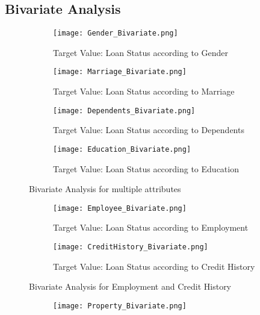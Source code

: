 \documentclass[10pt]{article}
\begin{document}
\begin{enumerate}
\subsection*{Bivariate Analysis}
\begin{figure}[H]
    \centering
    \begin{subfigure}[b]{0.45\linewidth}
        \texttt{[image: Gender\_Bivariate.png]}
        \caption{Target Value: Loan Status according to Gender}
        \label{fig:sub1}
    \end{subfigure}
    \hfill
    \begin{subfigure}[b]{0.45\linewidth}
        \texttt{[image: Marriage\_Bivariate.png]}
        \caption{Target Value: Loan Status according to Marriage}
        \label{fig:sub2}
    \end{subfigure}
    \begin{subfigure}[b]{0.45\linewidth}
        \texttt{[image: Dependents\_Bivariate.png]}
        \caption{Target Value: Loan Status according to Dependents}
        \label{fig:sub2}
    \end{subfigure}
    \begin{subfigure}[b]{0.45\linewidth}
        \texttt{[image: Education\_Bivariate.png]}
        \caption{Target Value: Loan Status according to Education}
        \label{fig:sub2}
    \end{subfigure}
    \caption{Bivariate Analysis for multiple attributes}
    \label{fig:panel}
\end{figure}
\begin{figure}[H]
    \centering
    \begin{subfigure}[b]{0.45\linewidth}
        \texttt{[image: Employee\_Bivariate.png]}
        \caption{Target Value: Loan Status according to Employment}
        \label{fig:sub2}
    \end{subfigure}
    \begin{subfigure}[b]{0.45\linewidth}
        \texttt{[image: CreditHistory\_Bivariate.png]}
        \caption{Target Value: Loan Status according to Credit History}
        \label{fig:sub2}
    \end{subfigure}
    \caption{Bivariate Analysis for Employment and Credit History}
    \label{fig:panel}
\end{figure}
\begin{figure}[H]
    \centering
    \begin{subfigure}[b]{0.45\linewidth}
        \texttt{[image: Property\_Bivariate.png]}

\end{subfigure}
\end{figure}
\end{enumerate}
\end{document}
